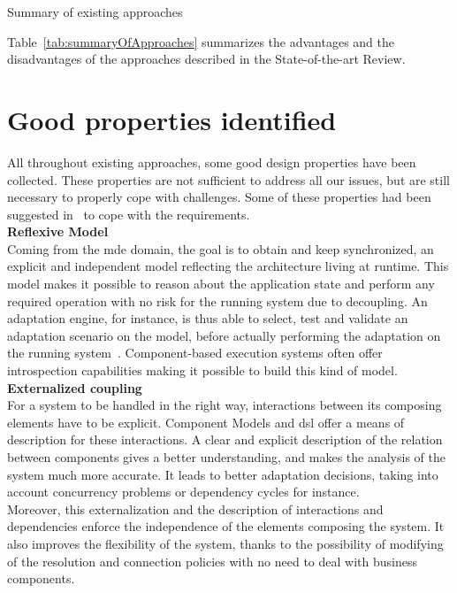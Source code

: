 \begin{table}[h!]
\caption{Summary of existing approaches}
\label{tab:summaryOfApproaches}
\end{table}




Table~\ref{tab:summaryOfApproaches} summarizes the advantages and the disadvantages of the approaches described in the State-of-the-art Review.\\


\section{Good properties identified}

All throughout existing approaches, some good design properties have been collected. These properties are not sufficient to address all our issues, but are still necessary to properly cope with challenges. Some of these properties had been suggested in~\cite{Nain09a} to cope with the requirements.\\

{\bf Reflexive Model}\\
Coming from the \gls{mde} domain, the goal is to obtain and keep synchronized, an explicit and independent model reflecting the architecture living at runtime. This model makes it possible to reason about the application state and perform any required operation with no risk for the running system due to decoupling. An adaptation engine, for instance, is thus able to select, test and validate an adaptation scenario on the model, before actually performing the adaptation on the running system~\cite{Leger:2007}.
Component-based execution systems often offer introspection capabilities making it possible to build this kind of model.\\

{\bf Externalized coupling}\\
For a system to be handled in the right way, interactions between its composing elements have to be explicit. Component Models and \gls{dsl} offer a means of description for these interactions. A clear and explicit description of the relation between components gives a better understanding, and makes the analysis of the system much more accurate. It leads to better adaptation decisions, taking into account concurrency problems or dependency cycles for instance.\\
Moreover, this externalization and the description of interactions and dependencies enforce the independence of the elements composing the system. It also improves the flexibility of the system, thanks to the possibility of modifying of the resolution and connection policies with no need to deal with business components.\\

